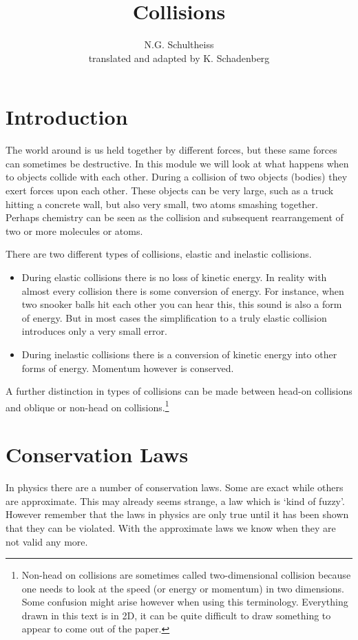 


\author{N.G. Schultheiss \\ translated and adapted by K. Schadenberg}
\date{}
\title{Collisions}



\maketitle

\section{Introduction}
The world around is us held together by different forces, but these same forces can sometimes be destructive. In this module we will look at what happens when to objects collide with each other. During a collision of two objects (bodies) they exert forces upon each other. These objects can be very large, such as a truck hitting a concrete wall, but also very small, two atoms smashing together. Perhaps chemistry can be seen as the collision and subsequent rearrangement of two or more molecules or atoms.

There are two different types of collisions, elastic and inelastic collisions.
\begin{itemize}
\item During elastic collisions there is no loss of kinetic energy. In reality with almost every collision there is some conversion of energy. For instance, when two snooker balls hit each other you can hear this, this sound is also a form of energy. But in most cases the simplification to a truly elastic collision introduces only a very small error.
\item During inelastic collisions there is a conversion of kinetic energy into other forms of energy. Momentum however is conserved.
\end{itemize}

A further distinction in types of collisions can be made between head-on collisions and oblique or non-head on collisions.\footnote{Non-head on collisions are sometimes called two-dimensional collision because one needs to look at the speed (or energy or momentum) in two dimensions. Some confusion might arise however when using this terminology. Everything drawn in this text is in 2D, it can be quite difficult to draw something to appear to come out of the paper.} 

\section{Conservation Laws}
In physics there are a number of conservation laws. Some are exact while others are approximate. This may already seems strange, a law which is `kind of fuzzy'. However remember that the laws in physics are only true until it has been shown that they can be violated. With the approximate laws we know when they are not valid any more.

